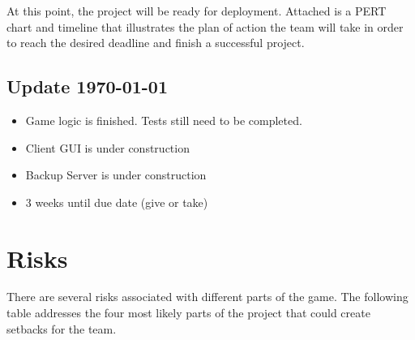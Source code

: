 \documentclass[11pt, titlepage]{article}
\begin{document}
At this point, the project will be ready for deployment.  Attached is a PERT chart and timeline that illustrates the plan of action the team will take in order to reach the desired deadline and finish a successful project.

\subsection{Update \today}
	\begin{itemize}
		\item Game logic is finished.  Tests still need to be completed.  
		\item Client GUI is under construction
		\item Backup Server is under construction
		\item 3 weeks until due date (give or take)
		\end{itemize} 

    \section{Risks}

	    There are several risks associated with different parts of the game.  The following table addresses the four most likely parts of the project that could create setbacks for the team.
\end{document}
